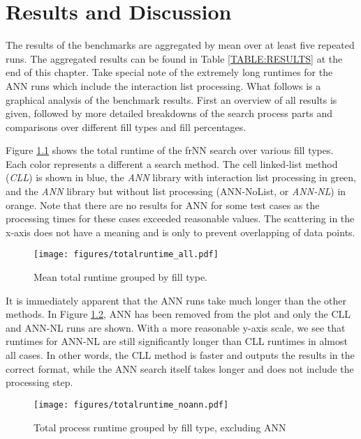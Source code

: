 

\chapter{Results and Discussion}

The results of the benchmarks are aggregated by mean over at least five repeated runs. The aggregated results can be found in Table \ref{TABLE:RESULTS} at the end of this chapter. Take special note of the extremely long runtimes for the ANN runs which include the interaction list processing. What follows is a graphical analysis of the benchmark results. First an overview of all results is given, followed by more detailed breakdowns of the search process parts and comparisons over different fill types and fill percentages.

Figure \ref{FIG:runtimeall} shows the total runtime of the frNN search over various fill types. Each color represents a different a search method. The cell linked-list method ({\itshape CLL}) is shown in blue, the {\itshape ANN} library with interaction list processing in green, and the {\itshape ANN} library but without list processing (ANN-NoList, or {\itshape ANN-NL}) in orange. Note that there are no results for ANN for some test cases as the processing times for these cases exceeded reasonable values. The scattering in the x-axis does not have a meaning and is only to prevent overlapping of data points.

\begin{figure}[h]
	\centering
	\texttt{[image: figures/totalruntime\_all.pdf]}
	\caption{Mean total runtime grouped by fill type.}
	\label{FIG:runtimeall}
\end{figure}

It is immediately apparent that the ANN runs take much longer than the other methods. In Figure \ref{FIG:runtimenoann}, ANN has been removed from the plot and only the CLL and ANN-NL runs are shown. With a more reasonable y-axis scale, we see that runtimes for ANN-NL are still significantly longer than CLL runtimes in almost all cases. In other words, the CLL method is faster and outputs the results in the correct format, while the ANN search itself takes longer and does not include the processing step.

\begin{figure}[h]
	\centering
	\texttt{[image: figures/totalruntime\_noann.pdf]}
	\caption{Total process runtime grouped by fill type, excluding ANN}
	\label{FIG:runtimenoann}
\end{figure}

